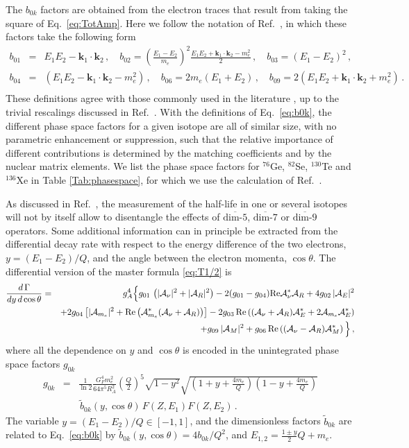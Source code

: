 \documentclass[letterpaper,11pt]{article}
\newcommand{\bea}{\begin{eqnarray}}
\newcommand{\eea}{\end{eqnarray}}
\renewcommand{\vec}[1]{{\mathbf #1}}
\newcommand{\sq}{^{2}}
\newcommand{\nn}{\nonumber}
\newcommand{\textoverline}[1]{$\overline{\mbox{#1}}$}
\begin{document}
The $b_{0k}$ factors are obtained from the electron traces that result from taking the square of Eq.\ \eqref{eq:TotAmp}. Here we follow the notation of Ref.\ \cite{Cirigliano:2017djv}, in which these factors take the following form
\bea\label{eq:b0k}
b_{01}&=&E_1 E_2-\vec k_1\cdot \vec k_2\,,\quad b_{02} = \left(\frac{E_1-E_2}{m_e}\right)\sq\frac{E_1 E_2 +\vec k_1\cdot \vec k_2 -m_e\sq}{2}\,,\quad b_{03} = (E_1-E_2)\sq\,,\nn\\
b_{04} &=& \left(E_1 E_2 -\vec k_1\cdot \vec k_2 -m_e\sq\right)\,,\quad  b_{06} = 2 m_e \left( E_1+E_2 \right)\,,\quad b_{09} = 2\left( E_1E_2+\vec k_1\cdot \vec k_2 +m_e\sq\right)\,. \nn\\
\eea
These definitions agree with those commonly used in the literature \cite{Doi:1985dx}, up to the trivial rescalings discussed in Ref.\ \cite{Cirigliano:2017djv}. 
With the definitions of Eq.~\eqref{eq:b0k}, the different phase space factors for a given isotope are all of similar size, with no parametric enhancement or suppression, such that the relative importance of different contributions is determined by the matching coefficients and by the nuclear matrix elements. We list the phase space factors for $^{76}$Ge, $^{82}$Se, $^{130}$Te and $^{136}$Xe in Table 
\ref{Tab:phasespace}, for which we use the calculation of Ref.\ \cite{Horoi:2017gmj}.


As discussed in Ref.\ \cite{Cirigliano:2017djv}, the measurement of the half-life in one or several isotopes will not by itself allow to disentangle 
the effects of \textoverline{dim-5}, \textoverline{dim-7} or \textoverline{dim-9} operators.  
Some additional information can in principle be extracted from the differential decay rate with respect to the energy difference  of the two electrons, $y = (E_1 - E_2)/Q$, and
the angle between the electron momenta, $\cos\theta$.
The differential version of the master formula \eqref{eq:T1/2} is 
\bea \label{eq:dT1/2}
\frac{d\, \Gamma}{d y\, d \cos\theta} &=& g_A^4 \Big\{ g_{01} \, \left( |\mathcal A_{\nu}|\sq + |\mathcal A_{R}|\sq \right)
- 2 (g_{01} - g_{04}) \textrm{Re} \mathcal A_{\nu}^* \mathcal A_{R} 
+ 4g_{02} \,|\mathcal A_{E}|\sq \nn \\ & & + 2 g_{04} \left[|\mathcal A_{m_e}|\sq+{\rm Re} \left(\mathcal A_{m_e}^* (\mathcal A_{\nu} + \mathcal A_{R})\right)\right]
-2 g_{03}\,{\rm Re}\left( (\mathcal A_{\nu} + \mathcal A_{R} )\mathcal A_{E}^*+2\mathcal A_{m_e} \mathcal A_{E}^*\right)
\nn\\
&&+ g_{09}\, |\mathcal A_{M}|\sq + g_{06}\, {\rm Re}\left( (\mathcal A_{\nu} - \mathcal A_{R} )\mathcal A_{M}^*\right) \Big\}\,,
\eea
where all the dependence on $y$ and $\cos\theta$ is encoded in the unintegrated phase space factors $g_{0k}$
\bea\label{eq:PhaseSpace2}
g_{0k}
&=&\frac{1}{\ln 2}\frac{G_F^4m_e\sq}{64\pi^5 R_A\sq} \left( \frac{Q}{2} \right)^5  \sqrt{  1 - y^2}  \sqrt{ \left( 1 + y + \frac{4 m_e}{Q} \right) \left(  1 - y + \frac{4 m_e}{Q}  \right) } \nn \\
& & \, \tilde{b}_{0k}(y,\cos\theta) \,F\left(Z,E_1\right)F\left(Z,E_2\right)\,.
\eea
The variable $y = (E_1-E_2)/Q \in [-1,1]$, and the dimensionless factors $\tilde b_{0k}$ are related to Eq.\ \eqref{eq:b0k} by  
$
\tilde b_{0k}(y,\cos\theta) = 4 b_{0k}/Q^2$, and $E_{1,2} =\frac{1\pm y}{2}Q+m_e$. 
\end{document}
